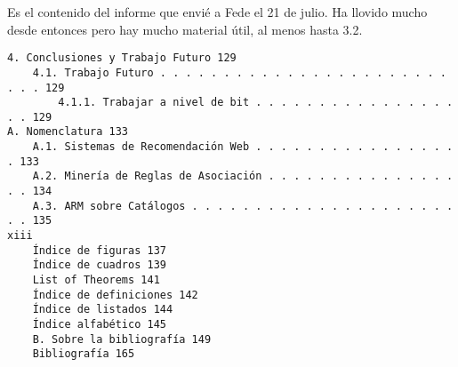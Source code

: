 
Es el contenido del informe que envié a Fede el 21 de julio. Ha llovido mucho desde entonces pero hay mucho material útil, al menos hasta 3.2.


{\footnotesize
\begin{verbatim}
4. Conclusiones y Trabajo Futuro 129
	4.1. Trabajo Futuro . . . . . . . . . . . . . . . . . . . . . . . . . . 129
		4.1.1. Trabajar a nivel de bit . . . . . . . . . . . . . . . . . . 129
A. Nomenclatura 133
	A.1. Sistemas de Recomendación Web . . . . . . . . . . . . . . . . . 133
	A.2. Minería de Reglas de Asociación . . . . . . . . . . . . . . . . . 134
	A.3. ARM sobre Catálogos . . . . . . . . . . . . . . . . . . . . . . . 135
xiii
	Índice de figuras 137
	Índice de cuadros 139
	List of Theorems 141
	Índice de definiciones 142
	Índice de listados 144
	Índice alfabético 145
	B. Sobre la bibliografía 149
	Bibliografía 165
\end{verbatim}
}
